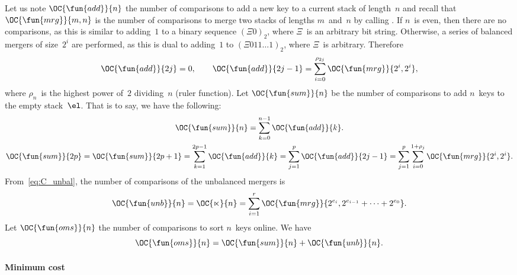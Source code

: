 Let us note \(\OC{\fun{add}}{n}\) the
number of comparisons to add a new key to a current stack of
length~\(n\) and recall that
\(\OC{\fun{mrg}}{m,n}\) is the number
of comparisons to merge two stacks of lengths \(m\)~and~\(n\) by
calling . If \(n\)~is even, then
there are no comparisons, as this is similar to adding~\(1\) to a
binary sequence \((\Xi{0})_2\), where \(\Xi\)~is an arbitrary bit
string. Otherwise, a series of balanced mergers of size~\(2^i\) are
performed, as this is dual to adding~\(1\) to \((\Xi{011}\ldots
1)_2\), where \(\Xi\)~is arbitrary. Therefore
\begin{equation*}
\OC{\fun{add}}{2j} = 0,\qquad
\OC{\fun{add}}{2j-1} = \sum_{i=0}^{\rho_{2j}}{\OC{\fun{mrg}}{2^i,2^i}},
\end{equation*}
where \(\rho_n\)~is the highest power of~\(2\) dividing~\(n\) (ruler
function).  Let
\(\OC{\fun{sum}}{n}\) be the number of
comparisons to add \(n\)~keys to the empty stack~\(\el\). That is to
say, we have the following:
\begin{gather}
\OC{\fun{sum}}{n} = \sum_{k=0}^{n-1}{\OC{\fun{add}}{k}}.\notag\\[0mm]
\OC{\fun{sum}}{2p} = \OC{\fun{sum}}{2p+1}
= \sum_{k=1}^{2p-1}{\OC{\fun{add}}{k}}
= \sum_{j=1}^{p}{\OC{\fun{add}}{2j-1}}
= \sum_{j=1}^{p}\sum_{i=0}^{1+\rho_{j}}{\OC{\fun{mrg}}{2^i,2^i}}.
\label{eq:sum_2p}
\end{gather}
From~\eqref{eq:C_unbal}, the number of comparisons of the
unbalanced mergers is
\begin{equation}
\OC{\fun{unb}}{n}
= \OC{\ltimes}{n}
= \sum_{i=1}^{r}{\OC{\fun{mrg}}{2^{e_i},2^{e_{i-1}}+\dots+2^{e_0}}}.
\index{unb@$\OC{\fun{unb}}{n}$}
\label{eq:cost_unb}
\end{equation}
Let \(\OC{\fun{oms}}{n}\) the number of
comparisons to sort \(n\)~keys online. We have
\begin{equation}
\OC{\fun{oms}}{n} = \OC{\fun{sum}}{n} + \OC{\fun{unb}}{n}.
\index{sum@$\OC{\fun{sum}}{n}$}
\label{eq:ocost_online}
\end{equation}

\paragraph{Minimum cost}

